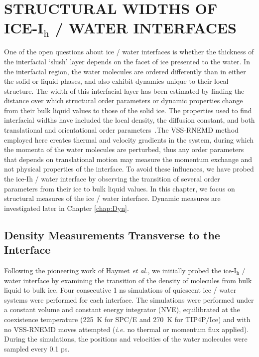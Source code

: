 
\chapter{STRUCTURAL WIDTHS OF ICE-I$_\mathrm{h}$ / WATER INTERFACES}\label{chap:Str}
One of the open questions about ice / water interfaces is whether the
thickness of the interfacial `slush' layer depends on the facet of ice
presented to the water. In the interfacial region, the water molecules
are ordered differently than in either the solid or liquid phases, and
also exhibit dynamics unique to their local structure.  The width of
this interfacial layer has been estimated by finding the distance over
which structural order parameters or dynamic properties change from
their bulk liquid values to those of the solid ice. The properties
used to find interfacial widths have included the local density, the
diffusion constant, and both translational and orientational order
parameters~\cite{Karim1988,Karim1990,Hayward2001,Hayward2002,Bryk2002,Gay2002,Louden2013a}.The
VSS-RNEMD method employed here creates thermal and velocity gradients
in the system, during which the momenta of the water molecules are
perturbed, thus any order parameters that depends on translational
motion may measure the momentum exchange and not physical properties
of the interface. To avoid these influences, we have probed the
ice-I$\mathrm{h}$ / water interface by observing the transition of
several order parameters from their ice to bulk liquid values.  In
this chapter, we focus on structural measures of the ice / water
interface. Dynamic measures are investigated later in Chapter
\ref{chap:Dyn}.

\section{Density Measurements Transverse to the Interface}
Following the pioneering work of Haymet \textit{et al.}, we initially
probed the ice-I$_\mathrm{h}$ / water interface by examining the
transition of the density of molecules from bulk liquid to bulk
ice. Four consecutive 1 ns simulations of quiescent ice / water
systems were performed for each interface. The simulations were
performed under a constant volume and constant energy integrator
(NVE), equilibrated at the coexistence temperature (225~K for SPC/E
and 270~K for TIP4P/Ice) and with no VSS-RNEMD moves attempted
(\textit{i.e.} no thermal or momentum flux applied). During the
simulations, the positions and velocities of the water molecules were
sampled every 0.1 ps.

